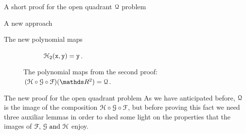 \documentclass[11pt, a4paper, english, twoside, notitlepage, openright]{report}
\begin{document}
\begin{chapter}{A short proof for the open quadrant $\mathcal{Q}$ problem}
\begin{section}{A new approach}
\begin{subsection}{The new polynomial maps}
\begin{figure}
\begin{subfigure}{.49\linewidth}
\vspace{0.15cm}\caption{$\mathcal{H}_2({\tt x},{\tt y})={\tt y}$.\label{fig:HH_2}}
\end{subfigure}
\vspace{0.7cm}\caption{The polynomial maps from the second proof: $(\HH\circ\GG\circ\FF)(\R^2)=\Qu$.\label{fig:ch2Maps}}
\end{figure}
\end{subsection}
\end{section}

\begin{section}{The new proof for the open quadrant problem}
As we have anticipated before, $\mathcal{Q}$ is the image of the composition $\mathcal{H}\circ\mathcal{G}\circ \mathcal{F}$, but before proving this fact we need three auxiliar lemmas in order to shed some light on the properties that the images of $\mathcal{F},\,\mathcal{G}\text { and }\mathcal{H}$ enjoy.


\end{section}
\end{chapter}
\end{document}
